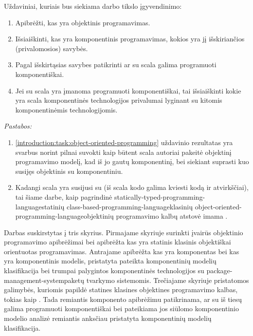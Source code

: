 Uždaviniai, kuriais bus siekiama darbo tikslo įgyvendinimo:
\begin{enumerate}
  \item \label{introduction:task:object-oriented-programming}
    Apibrėžti, kas yra objektinis programavimas.
  \item Išsiaiškinti, kas yra komponentinis programavimas, kokios
    yra jį išskiriančios (privalomosios) savybės.
  \item Pagal išskirtąsias savybes patikrinti ar su
    \gls{scala}{} galima programuoti komponentiškai.
  \item Jei su \gls{scala}{} yra įmanoma programuoti
    komponentiškai, tai išsiaiškinti kokie yra
    \gls{scala}{} komponentinės technologijos
    privalumai lyginant su kitomis komponentinėmis technologijomis.
\end{enumerate}
\emph{Pastabos:}
\begin{enumerate}
  \item \ref{introduction:task:object-oriented-programming}
    uždavinio rezultatas yra svarbus norint pilnai suvokti kaip būtent
    \gls{scala}{} autoriai pakeitė objektinį programavimo
    modelį, kad iš jo gautų komponentinį, bei siekiant suprasti kuo
    susijęs objektinis su komponentiniu.
  \item Kadangi \gls{scala}{} yra susijusi su
     (iš \gls{scala}{} kodo galima
    kviesti  kodą ir atvirkščiai), tai šiame darbe,
    kaip pagrindinė \gls{statically-typed-programming-language}{statinių}
    \gls{class-based-programming-language}{klasinių}
    \gls{object-oriented-programming-language}{objektinių}
    programavimo kalbų atstovė imama .
\end{enumerate}

Darbas suskirstytas į tris skyrius. Pirmajame skyriuje surinkti
įvairūs objektinio programavimo apibrėžimai bei apibrėžta kas
yra statinis klasinis objektiškai orientuotas programavimas.
Antrajame apibrėžta kas yra komponentas bei kas yra komponentinis
modelis, pristatyta \cite{classification-framework-for-scm} pateikta
komponentinių modelių klasifikacija bei trumpai palygintos
komponentinės technologijos su \gls{package-management-system}{paketų
tvarkymo sistemomis}. Trečiajame skyriuje pristatomos galimybės,
kuriomis  papildė statines klasines objektines
programavimo kalbas, tokias kaip . Tada remiantis
komponento apibrėžimu patikrinama, ar su  iš tiesų
galima programuoti komponentiškai bei pateikiama jos siūlomo
komponentinio modelio analizė remiantis anksčiau pristatyta
komponentinių modelių klasifikacija.
